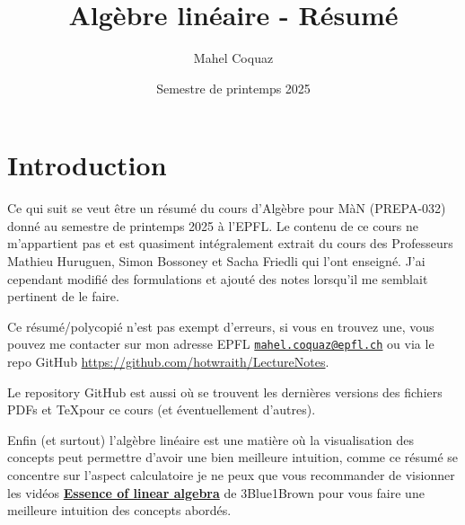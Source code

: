 \documentclass[10pt,a4paper]{book}
\title{Algèbre linéaire \vspace{0.2cm} - Résumé}
\author{Mahel Coquaz}
\date{Semestre de printemps 2025}
\begin{document}
\maketitle
\tableofcontents
\newpage
\section*{Introduction}
Ce qui suit se veut être un résumé du cours d'Algèbre pour MàN (PREPA-032) donné au semestre de printemps 2025 à l'EPFL. Le contenu de ce cours ne m'appartient pas et est quasiment intégralement extrait du cours des Professeurs Mathieu Huruguen, Simon Bossoney et Sacha Friedli qui l'ont enseigné. J'ai cependant modifié des formulations et ajouté des notes lorsqu'il me semblait pertinent de le faire. \par
Ce résumé/polycopié n'est pas exempt d'erreurs, si vous en trouvez une, vous pouvez me contacter sur mon adresse EPFL \texttt{\href{mailto:mahel.coquaz@epfl.ch}{mahel.coquaz@epfl.ch}} ou via le repo GitHub \url{https://github.com/hotwraith/LectureNotes}. \par
Le repository GitHub est aussi où se trouvent les dernières versions des fichiers PDFs et \TeX pour ce cours (et éventuellement d'autres). \par
Enfin (et surtout) l'algèbre linéaire est une matière où la visualisation des concepts peut permettre d'avoir une bien meilleure intuition, comme ce résumé se concentre sur l'aspect calculatoire je ne peux que vous recommander de visionner les vidéos 
\textbf{\href{https://youtube.com/playlist?list=PLZHQObOWTQDPD3MizzM2xVFitgF8hE_ab}{Essence of linear algebra}} de 3Blue1Brown pour vous faire une meilleure intuition des concepts abordés.
\end{document}
